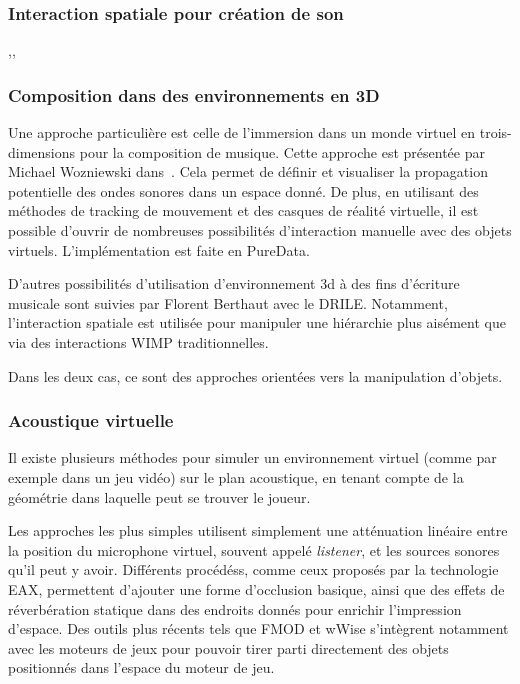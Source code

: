 \documentclass[french,12pt]{article}
\begin{document}
\subsubsection{Interaction spatiale pour création de son}
,\cite{sasamoto_controlling_2013},

\subsubsection{Composition dans des environnements en 3D}
Une approche particulière est celle de l'immersion dans un monde virtuel en trois-dimensions pour la composition de musique. Cette approche est présentée par Michael Wozniewski dans~\cite{wozniewski_framework_2006}. Cela permet de définir et visualiser la propagation potentielle des ondes sonores dans un espace donné. De plus, en utilisant des méthodes de tracking de mouvement et des casques de réalité virtuelle, il est possible d'ouvrir de nombreuses possibilités d'interaction manuelle avec des objets virtuels. L'implémentation est faite en PureData.

D'autres possibilités d'utilisation d'environnement 3d à des fins d'écriture musicale sont suivies par Florent Berthaut avec le DRILE\cite{berthaut_drile:_2010}. Notamment, l'interaction spatiale est utilisée pour manipuler une hiérarchie plus aisément que via des interactions WIMP traditionnelles.

Dans les deux cas, ce sont des approches orientées vers la manipulation d'objets.

\subsubsection{Acoustique virtuelle}
Il existe plusieurs méthodes pour simuler un environnement virtuel (comme par exemple dans un jeu vidéo) sur le plan acoustique, en tenant compte de la géométrie dans laquelle peut se trouver le joueur.

Les approches les plus simples utilisent simplement une atténuation linéaire entre la position du microphone virtuel, souvent appelé \textit{listener}, et les sources sonores qu'il peut y avoir. Différents procédéss, comme ceux proposés par la technologie EAX\cite{funkhouser_survey_2003}, permettent d'ajouter une forme d'occlusion basique, ainsi que des effets de réverbération statique dans des endroits donnés pour enrichir l'impression d'espace. Des outils plus récents tels que FMOD et wWise s'intègrent notamment avec les moteurs de jeux pour pouvoir tirer parti directement des objets positionnés dans l'espace du moteur de jeu.
\end{document}
